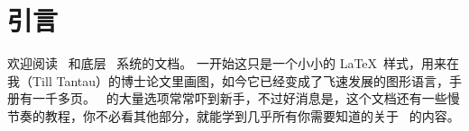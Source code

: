 %
%
%


\section{引言}

\begin{onehalfspacing}


欢迎阅读 \tikzname\ 和底层 \pgfname\ 系统的文档。
一开始这只是一个小小的 La\TeX\ 样式，用来在我（Till Tantau）的博士论文里画图，如今它已经变成了飞速发展的图形语言，手册有一千多页。
\tikzname\ 的大量选项常常吓到新手，不过好消息是，这个文档还有一些慢节奏的教程，你不必看其他部分，就能学到几乎所有你需要知道的关于 \tikzname\ 的内容。



\end{onehalfspacing}
